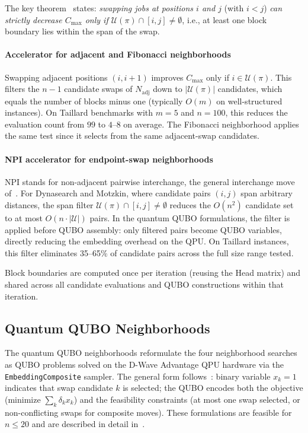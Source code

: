 \documentclass[preprint,12pt,authoryear]{elsarticle}
\begin{document}
The key theorem~\citep{ref_smutnicki} states: \emph{swapping jobs at
positions $i$ and $j$} \textup{(with $i < j$)} \emph{can strictly decrease $C_{\max}$
only if $\mathcal{U}(\pi) \cap [i, j] \neq \emptyset$}, i.e., at
least one block boundary lies within the span of the swap.

\paragraph{Accelerator for adjacent and Fibonacci neighborhoods}
Swapping adjacent positions $(i, i+1)$ improves $C_{\max}$ only if
$i \in \mathcal{U}(\pi)$. This filters the $n-1$ candidate swaps of
$N_{\mathrm{adj}}$ down to $|\mathcal{U}(\pi)|$ candidates, which
equals the number of blocks minus one (typically $O(m)$ on
well-structured instances). On Taillard benchmarks with $m = 5$
and $n = 100$, this reduces the evaluation count from $99$ to
$4$--$8$ on average. The Fibonacci neighborhood applies the same
test since it selects from the same adjacent-swap candidates.

\paragraph{NPI accelerator for endpoint-swap neighborhoods}
NPI stands for non-adjacent pairwise interchange, the general
interchange move of~\citep{dellacroce95}.
For Dynasearch and Motzkin, where candidate pairs $(i, j)$ span
arbitrary distances, the span filter $\mathcal{U}(\pi) \cap [i,j] \neq \emptyset$
reduces the $O(n^2)$ candidate set to at most $O(n \cdot |\mathcal{U}|)$
pairs. In the quantum QUBO formulations, the filter is applied before
QUBO assembly: only filtered pairs become QUBO variables, directly
reducing the embedding overhead on the QPU.
On Taillard instances, this filter eliminates 35--65\% of candidate
pairs across the full size range tested.

Block boundaries are computed once per iteration (reusing the Head
matrix) and shared across all candidate evaluations and QUBO
constructions within that iteration.

\subsection{Quantum QUBO Neighborhoods}

The quantum QUBO neighborhoods reformulate the four
neighborhood searches as QUBO problems solved on the D-Wave Advantage QPU
hardware via the \texttt{EmbeddingComposite} sampler. The general
form follows~\citep{WojewodzkiBozejkoBPASTS2026}: binary variable $x_k = 1$
indicates that swap candidate $k$ is selected; the QUBO encodes both
the objective (minimize $\sum_k \delta_k x_k$) and the feasibility
constraints (at most one swap selected, or non-conflicting swaps for
composite moves). These formulations are feasible for $n \leq 20$ and
are described in detail in~\citep{WojewodzkiBozejkoBPASTS2026}.
\end{document}
